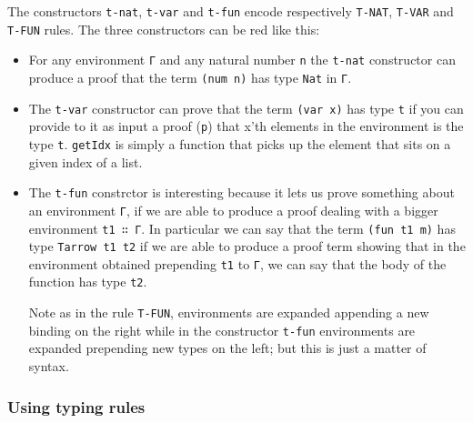 \documentclass{article}
\begin{document}
The constructors \texttt{t-nat}, \texttt{t-var} and \texttt{t-fun} encode respectively \texttt{T-NAT}, \texttt{T-VAR} and \texttt{T-FUN} rules.
The three constructors can be red like this:
\begin{itemize}

\item For any environment \texttt{Γ} and any natural number \texttt{n} the \texttt{t-nat} constructor can produce a proof that the term \texttt{(num n)} has type \texttt{Nat} in \texttt{Γ}.

\item The \texttt{t-var} constructor can prove that the term \texttt{(var x)} has type \texttt{t} if you can provide to it as input a proof (\texttt{p}) that x'th elements in the environment is the type \texttt{t}.
\texttt{getIdx} is simply a function that picks up the element that sits on a given index of a list.

\item The \texttt{t-fun} constrctor is interesting because it lets us prove something about an environment \texttt{Γ}, if we are able to produce a proof dealing with a bigger environment \texttt{t1 ∷ Γ}.
In particular we can say that the term \texttt{(fun t1 m)} has type \texttt{Tarrow t1 t2} if we are able to produce a proof term showing that in the environment obtained prepending \texttt{t1} to \texttt{Γ}, we can say that the body of the function has type \texttt{t2}.

Note as in the rule \texttt{T-FUN}, environments are expanded appending a new binding on the right while in the constructor \texttt{t-fun} environments are expanded prepending new types on the left; but this is just a matter of syntax.

\end{itemize}


\subsubsection{Using typing rules}
\end{document}
